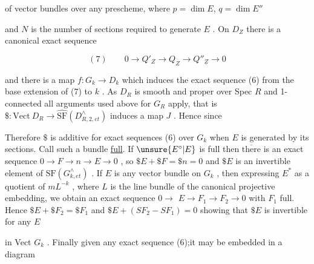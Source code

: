 of vector bundles over any prescheme, where $p = \dim E$, $q = \dim E''$



and $N$ is the number of sections required to generate $E$ . On
$D_Z$ there is a canonical exact sequence

\[ (7) \qquad 0 \to Q'_Z \to Q_Z \to Q''_{\underline Z} \to 0 \]

and there is a map $f:G_k \to D_k$ which induces the exact sequence
(6) from the base extension of (7) to $k$ . As $D_R$ is smooth and
proper over Spec $R$ and 1-connected all arguments used above for
$G_R$ apply, that is $\$:\mathrm{Vect}\ D_R \to \hat{\mathrm{SF}}(D^{\wedge}_{R,2,et})$ induces a map $J$ .
Hence since


Therefore $\$$ is additive for exact sequences (6) over $G_k$
when $E$ is generated by its sections. Call such a bundle \uline{full}.
If $\unsure{E^\circ|E}$ is full then $\overline{\text{there}}$ is an exact sequence $0 \to F \to n \to E \to 0$ ,
so $\$E + \$F = \$n = 0$ and $\$E$ is an invertible element of
$\mathrm{SF}(G^{\wedge}_{k,et})$ . If $E$ is any vector bundle on $G_k$ , then expressing
$E^*$ as a quotient of $mL^{-k}$ , where $L$ is the line bundle of the
canonical projective embedding, we obtain an exact sequence $0 \to$
$E \to F_1 \to F_2 \to 0$ with $F_1$ full. Hence $\$E + \$F_2 = \$F_1$ and
$\$E + (SF_2 - SF_1) = 0$ showing that $\$E$ is invertible for any $E$



in Vect $G_k$ . Finally given any exact sequence (6);it may be
embedded in a diagram


